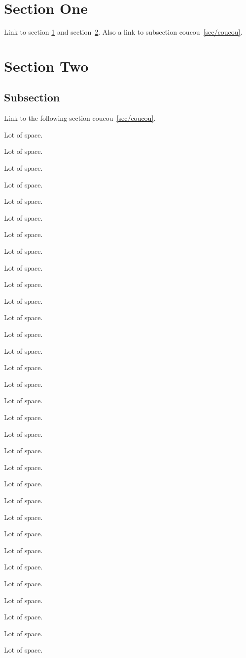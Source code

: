 \documentclass{article}
\begin{document}
\section{Section One}\label{sec/one}
Link to section \ref{sec/one} and section~\ref{sec/two}.
Also a link to subsection coucou~\ref{sec/coucou}.
\section{Section Two}\label{sec/two}
\subsection{Subsection}
Link to the following section coucou~\ref{sec/coucou}.

Lot of space.\par
Lot of space.\par
Lot of space.\par
Lot of space.\par
Lot of space.\par
Lot of space.\par
Lot of space.\par
Lot of space.\par
Lot of space.\par
Lot of space.\par
Lot of space.\par
Lot of space.\par
Lot of space.\par
Lot of space.\par
Lot of space.\par
Lot of space.\par
Lot of space.\par
Lot of space.\par
Lot of space.\par
Lot of space.\par
Lot of space.\par
Lot of space.\par
Lot of space.\par
Lot of space.\par
Lot of space.\par
Lot of space.\par
Lot of space.\par
Lot of space.\par
Lot of space.\par
Lot of space.\par
Lot of space.\par
Lot of space.\par
\end{document}
